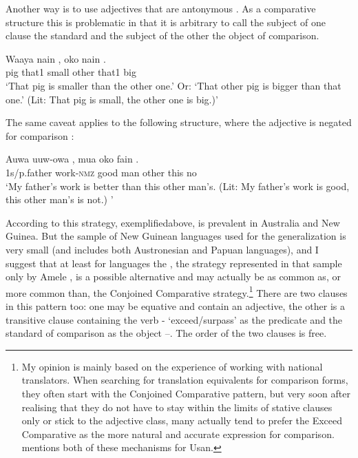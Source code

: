 Another way is to use adjectives that are antonymous . As a comparative structure this is problematic in that it is arbitrary to call the subject of one clause the standard and the subject of the other the object of comparison. 

\ea%
\label{ex:6:x1325}
\gll Waaya  nain  ,  oko  nain  . \\
pig  that1  small  other  that1  big\\
\glt `That pig is smaller than the other one.' Or: `That other pig is bigger than that one.' (Lit: That pig is small, the other one is big.)'
\z

The same caveat applies to the following structure, where the adjective is negated for comparison :

\ea%

\label{ex:6:x1326}
\gll Auwa  uuw-owa  ,  mua  oko  fain  . \\
1s/p.father  work-\textsc{nmz}  good  man  other  this  no\\
\glt `My father's work is better than this other man's. (Lit: My father's work is good, this other man's is not.) '
\z

According to \citet{Stassen2008} this  strategy, exemplified\linebreak above, is prevalent in  Australia and New Guinea. But the sample of New Guinean languages used for the generalization is very small (and includes both Austronesian and Papuan languages), and I suggest that at least for  languages the , the strategy represented in that sample only by Amele \citep[134--135]{Roberts1987}, is a possible alternative and may actually be as common as, or more common than, the Conjoined Comparative strategy.\footnote{My opinion is mainly based on the experience of working with national translators. When searching for translation equivalents for comparison forms, they often start with the Conjoined Comparative pattern, but very soon after realising that they do not have to stay within the limits of stative clauses only or stick to the adjective class, many actually tend to prefer the Exceed Comparative as the more natural and accurate expression for comparison.  \citet[68]{Reesink1987} mentions both of these mechanisms for Usan. }   There are two clauses in this pattern too: one may be equative and contain an adjective, the other is a transitive clause containing the verb - `exceed/surpass' as the predicate and the standard of comparison as the object --. The order of the two clauses is free.

